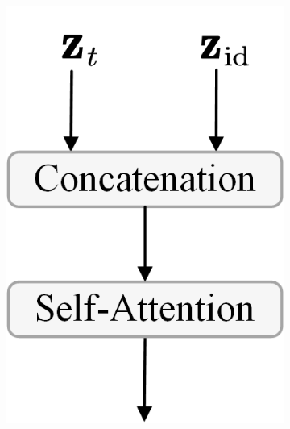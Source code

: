 \begin{figure}[t!]
\begin{minipage}[b]{0.32\textwidth}
\begin{minipage}[b]{\textwidth}
\begin{subfigure}{0.23\linewidth}
                \includegraphics[width=0.95\linewidth]{figs/RefCondition/VAE_SA.png}  
                \caption{}  
                \label{fig:RefConditionVAESA}  
            \end{subfigure}%
            \hfill
            \begin{subfigure}{0.30\linewidth} %
                \centering

\end{subfigure}
\end{minipage}
\end{minipage}
\end{figure}
